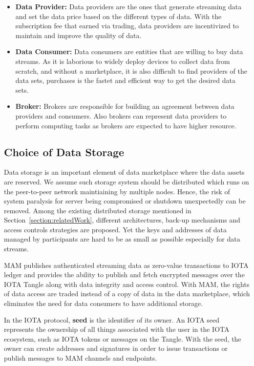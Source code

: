 \documentclass[conference]{IEEEtran}
\begin{document}
\begin{itemize}
\item \textbf{Data Provider: }
Data providers are the ones that generate streaming data and set the data price based on the different types of data. With the subscription fee that earned via trading, data providers are incentivized to maintain and improve the quality of data.
\item \textbf{Data Consumer: }
Data consumers are entities that are willing to buy data streams. As it is laborious to widely deploy devices to collect data from scratch, and without a marketplace, it is also difficult to find providers of the data sets, purchases is the fastet and efficient way to get the desired data sets. 
\item \textbf{Broker: }
Brokers are responsible for building an agreement between data providers and consumers. Also brokers can represent data providers to perform computing tasks as brokers are expected to have higher resource. 
\end{itemize}

\subsection{Choice of Data Storage}
Data storage is an important element of data marketplace where the data assets are reserved. We assume such storage system should be distributed which runs on the peer-to-peer network maintiaining by multiple nodes. Hence, the risk of system paralysis for server being compromised or shutdown unexpectedly can be removed. Among the existing distributed storage mentioned in Section~\ref{section:relatedWork}, different architectures, back-up mechanisms and access controls strategies are proposed. Yet the keys and addresses of data managed by participants are hard to be as small as possible especially for data streams.  

MAM publishes authenticated streaming data as zero-value transactions to IOTA ledger and provides the ability to publish and fetch encrypted messages over the IOTA Tangle along with data integrity and access control. With MAM, the rights of data access are traded instead of a copy of data in the data marketplace, which eliminates the need for data consumers to have additional storage.
 
In the IOTA protocol, \textbf{seed} is the identifier of its owner. An IOTA seed represents the ownership of all things associated with the user in the IOTA ecosystem, such as IOTA tokens or messages on the Tangle. With the seed, the owner can create addresses and signatures in order to issue transactions or publish messages to MAM channels and endpoints.
\end{document}
